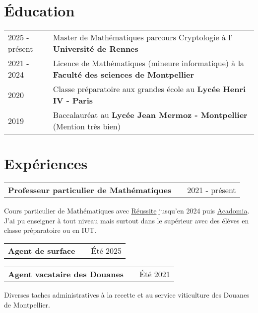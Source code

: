 \documentclass[a4paper,12pt]{article}
\makeatletter
\newenvironment{jobshort}[2]
    {
    \begin{tabularx}{\linewidth}{@{}l X r@{}}
    \textbf{#1} & \hfill &  #2 \\[3.75pt]
    \end{tabularx}
    }
    {
    }
\newenvironment{joblong}[2]
    {
    \begin{tabularx}{\linewidth}{@{}l X r@{}}
    \textbf{#1} & \hfill &  #2 \\[3.75pt]
    \end{tabularx}
    \begin{minipage}[t]{\linewidth}
    \begin{itemize}[nosep,after=\strut, leftmargin=1em, itemsep=3pt,label=--]
    }
    {
    \end{itemize}
    \end{minipage}    
    }
\makeatother
\begin{document}
\section{Éducation}
\begin{tabularx}{\linewidth}{@{}l X@{}}	


2025 - présent & Master de Mathématiques parcours Cryptologie à l' \textbf{Université de Rennes} \hfill  \\ 

2021 - 2024 & Licence de Mathématiques (mineure informatique) à la \textbf{Faculté des sciences de Montpellier} \hfill   \\

2020 & Classe préparatoire aux grandes école au \textbf{Lycée Henri IV - Paris} \hfill   \\

2019 & Baccalauréat au \textbf{Lycée Jean Mermoz - Montpellier} \hfill (Mention très bien)
\end{tabularx}


\section{Expériences}

\begin{jobshort}{Professeur particulier de Mathématiques}{2021 - présent}
Cours particulier de Mathématiques avec \href{https://groupe-reussite.fr/}{Réussite} jusqu'en 2024 puis \href{https://www.acadomia.fr/}{Acadomia}. J'ai pu enseigner à tout niveau mais surtout dans le supérieur avec des élèves en classe préparatoire ou en IUT.
\end{jobshort}

\begin{jobshort}{Agent de surface}{Été 2025}
\end{jobshort}

\begin{jobshort}{Agent vacataire des Douanes}{Été 2021}
Diverses taches administratives à la recette et au service viticulture des Douanes de Montpellier.
\end{jobshort}   

\end{document}
